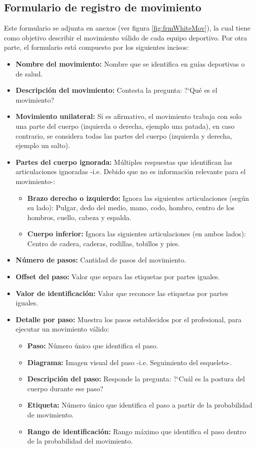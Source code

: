 \subsection{Formulario de registro de movimiento} \label{ins:frmMov}
Este formulario se adjunta en anexos (ver figura \ref{fig:frmWhiteMov}), la cual tiene como objetivo describir el movimiento v\'alido de cada equipo deportivo. Por otra parte, el formulario est\'a compuesto por los siguientes incisos:
\begin{itemize}
	\item \textbf{Nombre del movimiento:} Nombre que se identifica en gu\'ias deportivas o de salud.
	\item \textbf{Descripci\'on del movimiento: } Contesta la pregunta: ?`Qu\'e es el movimiento?
	\item \textbf{Movimiento unilateral:} Si es afirmativo, el movimiento trabaja con solo una parte del cuerpo (izquierda o derecha, ejemplo una patada), en caso contrario, se considera todas las partes del cuerpo (izquierda y derecha, ejemplo un salto).
	\item \textbf{Partes del cuerpo ignorada:} M\'ultiples respuestas que identifican las articulaciones ignoradas -i.e. Debido que no es informaci\'on relevante para el movimiento-:
	\begin{itemize}
		\item \textbf{Brazo derecho o izquierdo:} Ignora las siguientes articulaciones (seg\'un su lado): Pulgar, dedo del medio, mano, codo, hombro, centro de los hombros, cuello, cabeza y espalda.
		\item \textbf{Cuerpo inferior:} Ignora las siguientes articulaciones (en ambos lados): Centro de cadera, caderas, rodillas, tobillos y pies.
	\end{itemize}
		\item \textbf{N\'umero de pasos:} Cantidad de pasos del movimiento.
		\item \textbf{Offset del paso:} Valor que separa las etiquetas por partes iguales.
		\item \textbf{Valor de identificaci\'on:} Valor que reconoce las etiquetas por partes iguales.
		\item \textbf{Detalle por paso:} Muestra los pasos establecidos por el profesional, para ejecutar un movimiento v\'alido:
			\begin{itemize}
		\item \textbf{Paso:} N\'umero \'unico que identifica el paso.
		\item \textbf{Diagrama:} Imagen visual del paso -i.e. Seguimiento del esqueleto-.
		\item \textbf{Descripci\'on del paso:} Responde la pregunta: ?`Cu\'al es la postura del cuerpo durante ese paso?
		\item \textbf{Etiqueta:} N\'umero \'unico que identifica el paso a partir de la probabilidad de movimiento.
	\item \textbf{Rango de identificaci\'on:} Rango m\'aximo que identifica el paso dentro de la probabilidad del movimiento.
	\end{itemize}
\end{itemize}

